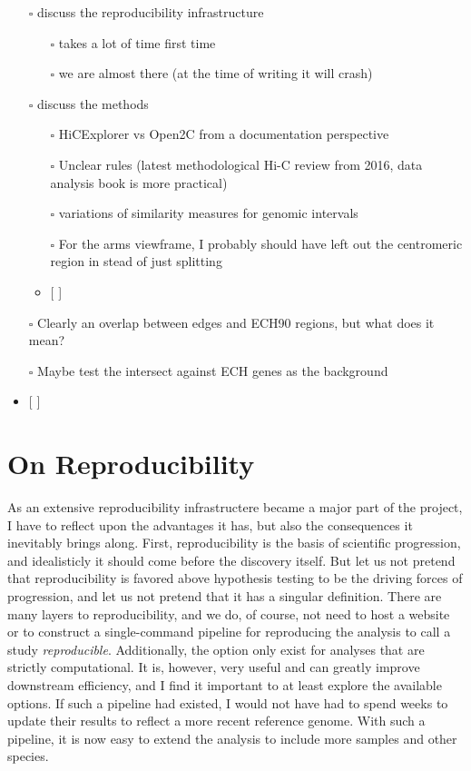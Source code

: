\documentclass[
  11pt,
  a4paper,
]{scrbook}
\providecommand{\tightlist}{%
  \setlength{\itemsep}{0pt}\setlength{\parskip}{0pt}}\usepackage{longtable,booktabs,array}
\let\oldemph\emph
\renewcommand\emph[1]{\oldemph{\color{gray}#1}}
\begin{document}
\begin{itemize}
\tightlist
\item[$\square$]
  discuss the reproducibility infrastructure

  \begin{itemize}
  \tightlist
  \item[$\square$]
    takes a lot of time first time
  \item[$\square$]
    we are almost there (at the time of writing it will crash)
  \end{itemize}
\item[$\square$]
  discuss the methods

  \begin{itemize}
  \tightlist
  \item[$\square$]
    HiCExplorer vs Open2C from a documentation perspective
  \item[$\square$]
    Unclear rules (latest methodological Hi-C review from 2016, data
    analysis book is more practical)
  \item[$\square$]
    variations of similarity measures for genomic intervals
  \item[$\square$]
    For the arms viewframe, I probably should have left out the
    centromeric region in stead of just splitting
  \item
    {[} {]}
  \end{itemize}
\item[$\square$]
  Clearly an overlap between edges and ECH90 regions, but what does it
  mean?
\item[$\square$]
  Maybe test the intersect against ECH genes as the background
\item
  {[} {]}
\end{itemize}

\section{On Reproducibility}\label{on-reproducibility}

As an extensive reproducibility infrastructere became a major part of
the project, I have to reflect upon the advantages it has, but also the
consequences it inevitably brings along. First, reproducibility is the
basis of scientific progression, and idealisticly it should come before
the discovery itself. But let us not pretend that reproducibility is
favored above hypothesis testing to be the driving forces of
progression, and let us not pretend that it has a singular definition.
There are many layers to reproducibility, and we do, of course, not need
to host a website or to construct a single-command pipeline for
reproducing the analysis to call a study \emph{reproducible}.
Additionally, the option only exist for analyses that are strictly
computational. It is, however, very useful and can greatly improve
downstream efficiency, and I find it important to at least explore the
available options. If such a pipeline had existed, I would not have had
to spend weeks to update their results to reflect a more recent
reference genome. With such a pipeline, it is now easy to extend the
analysis to include more samples and other species.
\end{document}
